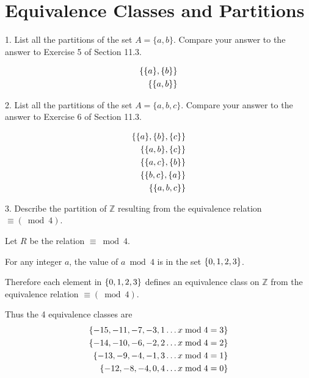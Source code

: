 \documentclass{article}
\begin{document}
\section{Equivalence Classes and Partitions}
\begin{exercise}{}{}
	{1. List all the partitions of the set $A=\{a, b\}$. Compare your answer to
		the answer to Exercise 5 of Section 11.3.}
	\begin{alist}
		\item
		\begin{align*}
			\{\{a\}, \{b\}\} \\
			\{\{a, b\}\}
		\end{align*}
	\end{alist}
\end{exercise}{}{}

\begin{exercise}{}{}{2. List all the partitions of the set $A=\{a, b, c\}$. Compare
		your answer to the answer to Exercise 6 of Section 11.3.}
	\begin{alist}
		\item
		\begin{align*}
			\{\{a\}, \{b\}, \{c\}\} \\
			\{\{a, b\}, \{c\}\}       \\
			\{\{a, c\}, \{b\}\}       \\
			\{\{b, c\}, \{a\}\}       \\
			\{\{a, b, c\}\}
		\end{align*}
		\item
	\end{alist}
\end{exercise}{}{}

\begin{exercise}{}{}
	{3. Describe the partition of $\mathbb{Z}$ resulting from the equivalence
		relation $\equiv(\bmod 4)$.}
	\begin{alist}
		\item Let $R$ be the relation $\equiv\bmod 4$.
		\item For any integer $a$, the value of $a\bmod 4$ is in the set $\{0, 1, 2, 3\}$.
		\item Therefore each element in $\{0, 1, 2, 3\}$ defines an equivalence class
		on $\mathbb{Z}$ from the equivalence relation $\equiv(\bmod 4)$.
		\item Thus the 4 equivalence classes are
		\begin{align*}
			\{-15, -11, -7, -3, 1 \dots x\bmod4=3\} \\
			\{-14, -10, -6, -2, 2 \dots x\bmod4=2\} \\
			\{-13, -9, -4, -1, 3 \dots x\bmod4=1\}  \\
			\{-12, -8, -4, 0, 4 \dots x\bmod4=0\}   \\
		\end{align*}
	\end{alist}
\end{exercise}{}{}
\end{document}

